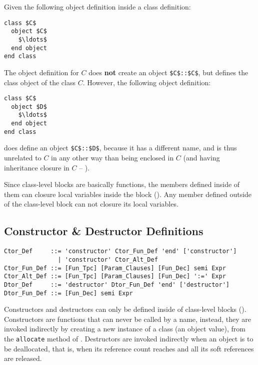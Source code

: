 \example Given the following object definition inside a class definition:
\begin{lstlisting}
class $C$
  object $C$
    $\ldots$
  end object
end class
\end{lstlisting}
The object definition for $C$ does \textbf{not} create an object \lstinline!$C$::$C$!, but defines the class object of the class $C$. However, the following object definition:
\begin{lstlisting}
class $C$
  object $D$
    $\ldots$
  end object
end class
\end{lstlisting}
does define an object \lstinline!$C$::$D$!, because it has a different name, and is thus unrelated to $C$ in any other way than being enclosed in $C$ (and having inheritance closure in $C$ -- ). 

Since class-level blocks are basically functions, the members defined inside of them can closure local variables inside the block (). Any member defined outside of the class-level block can not closure its local variables. 

\subsection{Constructor \& Destructor Definitions}
\label{sec:constructor-destructor-def}

\syntax\begin{lstlisting}
Ctor_Def     ::= 'constructor' Ctor_Fun_Def 'end' ['constructor']
               | 'constructor' Ctor_Alt_Def
Ctor_Fun_Def ::= [Fun_Tpc] [Param_Clauses] [Fun_Dec] semi Expr
Ctor_Alt_Def ::= [Fun_Tpc] [Param_Clauses] [Fun_Dec] ':=' Expr
Dtor_Def     ::= 'destructor' Dtor_Fun_Def 'end' ['destructor']
Dtor_Fun_Def ::= [Fun_Dec] semi Expr
\end{lstlisting}


Constructors and destructors can only be defined inside of class-level blocks (). Constructors are functions that can never be called by a name, instead, they are invoked indirectly by creating a new instance of a class (an object value), from the \lstinline!allocate! method of . Destructors are invoked indirectly when an object is to be deallocated, that is, when its reference count reaches  and all its soft references are released. 

